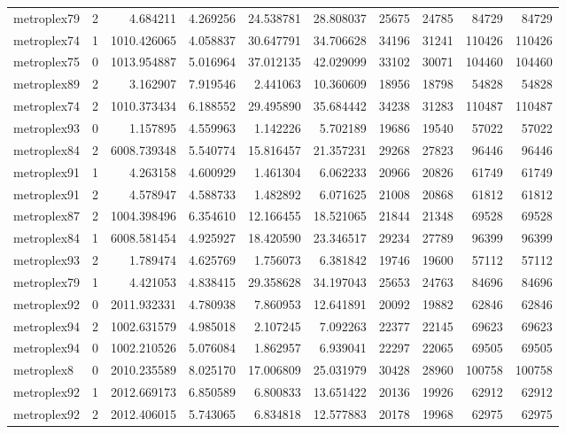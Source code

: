 \begin{longtable}{|l|r|r|r|r|r|r|r|r|r|}
metroplex79 & 2 & 4.684211 & 4.269256 & 24.538781 & 28.808037 & 25675 & 24785 & 84729 & 84729 \\
metroplex74 & 1 & 1010.426065 & 4.058837 & 30.647791 & 34.706628 & 34196 & 31241 & 110426 & 110426 \\
metroplex75 & 0 & 1013.954887 & 5.016964 & 37.012135 & 42.029099 & 33102 & 30071 & 104460 & 104460 \\
metroplex89 & 2 & 3.162907 & 7.919546 & 2.441063 & 10.360609 & 18956 & 18798 & 54828 & 54828 \\
metroplex74 & 2 & 1010.373434 & 6.188552 & 29.495890 & 35.684442 & 34238 & 31283 & 110487 & 110487 \\
metroplex93 & 0 & 1.157895 & 4.559963 & 1.142226 & 5.702189 & 19686 & 19540 & 57022 & 57022 \\
metroplex84 & 2 & 6008.739348 & 5.540774 & 15.816457 & 21.357231 & 29268 & 27823 & 96446 & 96446 \\
metroplex91 & 1 & 4.263158 & 4.600929 & 1.461304 & 6.062233 & 20966 & 20826 & 61749 & 61749 \\
metroplex91 & 2 & 4.578947 & 4.588733 & 1.482892 & 6.071625 & 21008 & 20868 & 61812 & 61812 \\
metroplex87 & 2 & 1004.398496 & 6.354610 & 12.166455 & 18.521065 & 21844 & 21348 & 69528 & 69528 \\
metroplex84 & 1 & 6008.581454 & 4.925927 & 18.420590 & 23.346517 & 29234 & 27789 & 96399 & 96399 \\
metroplex93 & 2 & 1.789474 & 4.625769 & 1.756073 & 6.381842 & 19746 & 19600 & 57112 & 57112 \\
metroplex79 & 1 & 4.421053 & 4.838415 & 29.358628 & 34.197043 & 25653 & 24763 & 84696 & 84696 \\
metroplex92 & 0 & 2011.932331 & 4.780938 & 7.860953 & 12.641891 & 20092 & 19882 & 62846 & 62846 \\
metroplex94 & 2 & 1002.631579 & 4.985018 & 2.107245 & 7.092263 & 22377 & 22145 & 69623 & 69623 \\
metroplex94 & 0 & 1002.210526 & 5.076084 & 1.862957 & 6.939041 & 22297 & 22065 & 69505 & 69505 \\
metroplex8 & 0 & 2010.235589 & 8.025170 & 17.006809 & 25.031979 & 30428 & 28960 & 100758 & 100758 \\
metroplex92 & 1 & 2012.669173 & 6.850589 & 6.800833 & 13.651422 & 20136 & 19926 & 62912 & 62912 \\
metroplex92 & 2 & 2012.406015 & 5.743065 & 6.834818 & 12.577883 & 20178 & 19968 & 62975 & 62975 \\

\end{longtable}
